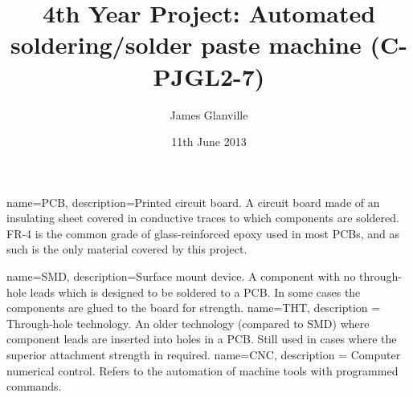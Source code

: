 {
	name=PCB,
	description={Printed circuit board. A circuit board made of an insulating sheet covered in conductive traces to which components are soldered. FR-4 is the common grade
			of glass-reinforced epoxy used in most PCBs, and as such is the only material covered by this project.}
}

{
	name=SMD,
	description={Surface mount device. A component with no through-hole leads which is designed to be soldered to a PCB. In some cases the components are glued to the board
			for strength.}
}
{
	name=THT,
	description = {Through-hole technology. An older technology (compared to SMD) where component leads are inserted into holes in a PCB. Still used in cases where the superior 
			attachment strength in required.}
}
{
	name=CNC,
	description = {Computer numerical control. Refers to the automation of machine tools with programmed commands.}
}


\usepackage{amsmath}                   %


\usepackage{listings}                  %
\lstset{
  basicstyle = \small
}

\providecommand{\e}[1]{\ensuremath{\times10^{#1}}}
\providecommand{\degrees}{\ensuremath{^{\circ}}}

\title{4th Year Project: Automated soldering/solder paste machine (C-PJGL2-7)} %
\author{James Glanville}
\date{11th June 2013}

\hypersetup{
    colorlinks,
    allcolors=blue,
    linktoc=all,
}



\maketitle

